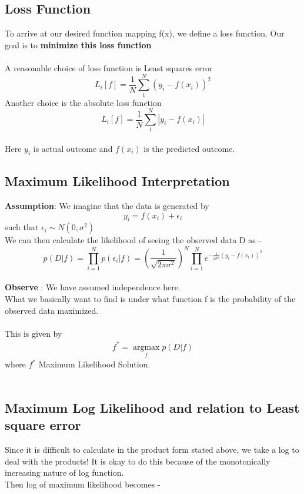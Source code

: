 \subsection{Loss Function}
To arrive at our desired function mapping f(x), we define a loss function. Our goal is to \textbf{minimize this loss function}
\\
\\
A reasonable choice of loss function is Least squares error
$$L_i[f]=\frac{1}{N}\sum_{1}^{N}(y_i-f(x_i))^2$$
Another choice is the absolute loss function $$L_i[f]=\frac{1}{N}\sum_{1}^{N}|y_i-f(x_i)|$$
\\
Here $y_i$ is actual outcome and $f(x_i)$ is the predicted outcome.

\subsection{Maximum Likelihood Interpretation}
\textbf{Assumption}: We imagine that the data is generated by
\begin{equation*}
y_i = f(x_i) + \epsilon_i
\end{equation*}
such that $\epsilon_i \sim N(0, \sigma^2)$
\\
We can then calculate the likelihood of seeing the observed data D as -
\begin{equation*}
p(D|f) =  \prod_{i=1}^{N}p(\epsilon_i | f) 
= (\frac{1}{\sqrt{2\pi\sigma^2}})^N \prod_{i=1}^{N}e^{-\frac{1}{2\sigma^2}(y_i - f(x_i))^2} 
\end{equation*}
\\
\textbf{Observe} : We have assumed independence here.
\\
What we basically want to find is under what function f is the probability of the observed data maximized.
\\
\\
This is given by
\\
\begin{align*}
f^{*} = \operatorname*{argmax}_f p(D|f) 
\end{align*}
where $f^{*}$ Maximum Likelihood Solution.
\\
\\


\subsection{Maximum Log Likelihood and relation to Least square error}
Since it is difficult to calculate in the product form stated above, we take a log to deal with the products! It is okay to do this because of the monotonically increasing nature of log function.
\\
Then log of maximum likelihood becomes -


